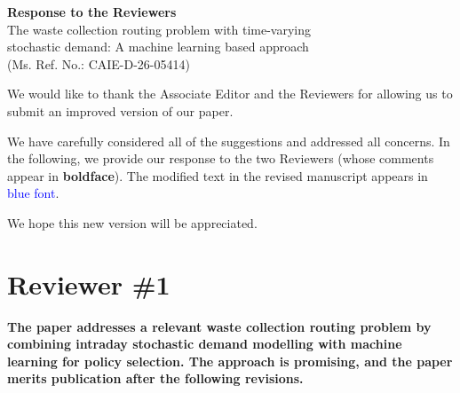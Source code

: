 \documentclass[11pt]{article}
\date{}
\begin{document}
	
	\begin{center}
		{\bf \Large Response to the Reviewers}\\\vspace{0.5cm}
		{\large The waste collection routing problem with time-varying\\ stochastic demand: A machine learning based approach\\  (Ms. Ref. No.:  CAIE-D-26-05414)}\vspace{0.5cm}
	\end{center}
	
	We would like to thank the Associate Editor and the Reviewers for allowing us to submit an improved version of our paper.
 
	We have carefully considered all of the	suggestions and addressed all concerns. In the following, we provide our response to the two Reviewers (whose comments appear in \textbf{boldface}). The modified text in the revised manuscript appears in \textcolor{blue}{blue font}.

     We hope this new version will be appreciated.\vspace{5mm}
	
\newpage

	\section*{Reviewer \#1}

\vspace{3mm}

    \textbf{The paper addresses a relevant waste collection routing problem by combining intraday
stochastic demand modelling with machine learning for policy selection. The approach is
promising, and the paper merits publication after the following revisions.}
\end{document}
